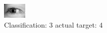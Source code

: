 \begin{figure}[h!]
\begin{center}
\includegraphics[width=0.60\columnwidth]{figures/ID3194_class_3_target_4.png}
\end{center}
\caption{ Classification: 3 actual target: 4}
\label{fig:ID3194_class_3_target_4}
\end{figure}
